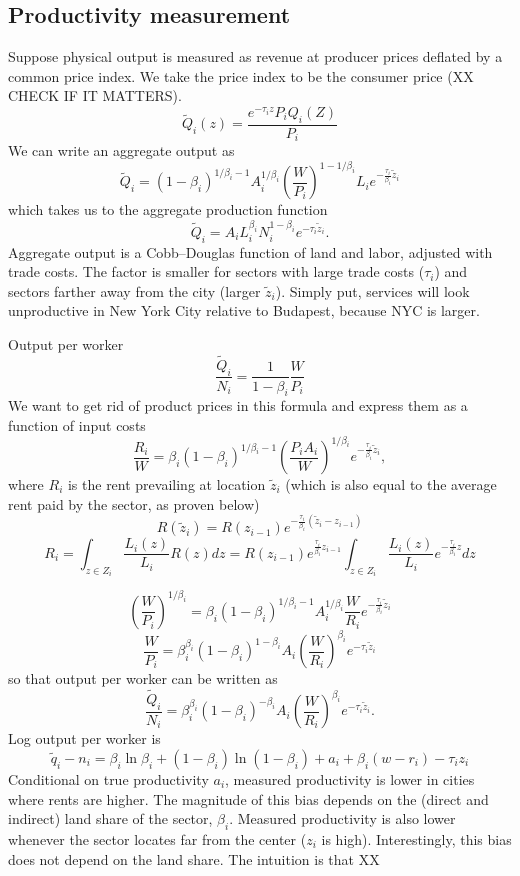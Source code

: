 \documentclass[12pt]{article}
\begin{document}
\subsection{Productivity measurement}
Suppose physical output is measured as revenue at producer prices deflated by a common price index. We take the price index to be the consumer price (XX CHECK IF IT MATTERS).
\[
\tilde Q_i(z) = \frac{e^{-\tau_i z}P_iQ_i(Z)}{P_i}
\]
We can write an aggregate output as
\[
\tilde Q_i = 
(1-\beta_i)^{1/\beta_i-1}
A_i^{1/\beta_i}\left(\frac{W}{P_i}\right)^{1-1/\beta_i}
L_i e^{-\frac{\tau_i}{\beta_i} \tilde z_i}
\]
which takes us to the aggregate production function
\[
\tilde Q_i = 
A_iL_i^{\beta_i}N_i^{1-\beta_i}
 e^{-\tau_i\tilde z_i}.
\]
Aggregate output is a Cobb--Douglas function of land and labor, adjusted with trade costs. The factor is smaller for sectors with large trade costs ($\tau_i$) and sectors farther away from the city (larger $\tilde z_i$). Simply put, services will look unproductive in New York City relative to Budapest, because NYC is larger.

Output per worker
\[
\frac{\tilde Q_i}{N_i} = \frac1{1-\beta_i}
\frac{W}{P_i} 
\]
We want to get rid of product prices in this formula and express them as a function of input costs
\[
\frac{R_i}{W} =\beta_i(1-\beta_i)^{1/\beta_i-1} \left(\frac{P_iA_i}{W}\right)^{1/\beta_i} e^{-\frac{\tau_i}{\beta_i} \tilde z_i},
\]
where $R_i$ is the rent prevailing at location $\tilde z_i$ (which is also equal to the average rent paid by the sector, as proven below)
\[
R(\tilde z_i) = 
R(z_{i-1})e^{-\frac{\tau_i}{\beta_i}(\tilde z_i-z_{i-1})}
\]
\[
R_i =\int_{z\in Z_i}\frac{L_i(z)}{L_i}R(z)dz =
R(z_{i-1})e^{\frac{\tau_i}{\beta_i}z_{i-1}}
\int_{z\in Z_i}\frac{L_i(z)}{L_i}e^{-\frac{\tau_i}{\beta_i}z}dz
\]

\[
\left(\frac{W}{P_i}\right)^{1/\beta_i}  =\beta_i(1-\beta_i)^{1/\beta_i-1} 
A_i^{1/\beta_i}
\frac{W}{R_i}
 e^{-\frac{\tau_i}{\beta_i} \tilde z_i}
\]
\[
\frac{W}{P_i}  =\beta_i^{\beta_i}(1-\beta_i)^{1-\beta_i} 
A_i
\left(\frac{W}{R_i}\right)^{\beta_i}
 e^{-\tau_i \tilde z_i}
\]
so that output per worker can be written as
\[
\frac{\tilde Q_i}{N_i} = \beta_i^{\beta_i}(1-\beta_i)^{-\beta_i} 
A_i
\left(\frac{W}{R_i}\right)^{\beta_i}e^{-\tau_i \tilde z_i}.
 \]
Log output per worker is
\[
\tilde q_i - n_i = 
\beta_i\ln\beta_i+(1-\beta_i)\ln(1-\beta_i)
+a_i +\beta_i (w
-r_i)
- \tau_{i}z_{i}
\]
Conditional on true productivity $a_i$, measured productivity is lower in cities where rents are higher. The magnitude of this bias depends on the (direct and indirect) land share of the sector, $\beta_i$. Measured productivity is also lower whenever the sector locates far from the center ($z_i$ is high). Interestingly, this bias does not depend on the land share. The intuition is that XX
\end{document}

